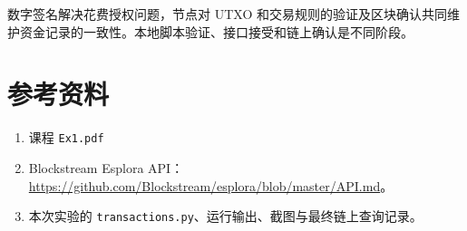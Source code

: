 \documentclass[UTF8,a4paper,11pt,fontset=windows]{ctexart}
\begin{document}
数字签名解决花费授权问题，节点对 UTXO 和交易规则的验证及区块确认共同维护资金记录的一致性。本地脚本验证、接口接受和链上确认是不同阶段。

\section*{参考资料}
\begin{enumerate}
\item 课程 \texttt{Ex1.pdf}
\item Blockstream Esplora API：\url{https://github.com/Blockstream/esplora/blob/master/API.md}。
\item 本次实验的 \texttt{transactions.py}、运行输出、截图与最终链上查询记录。
\end{enumerate}
\endgroup
\end{document}
